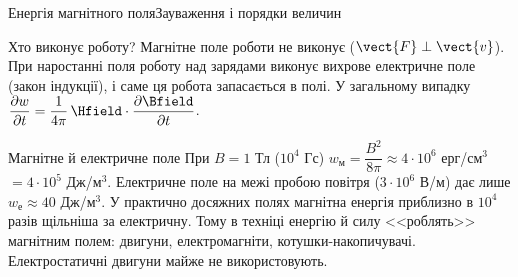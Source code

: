 \documentclass[onlytextwidth]{beamer}
\begin{document}
\begin{frame}{Енергія магнітного поля}{Зауваження і порядки величин}\small
	\begin{block}{Хто виконує роботу?}\justifying
		Магнітне поле роботи не виконує ($\vect{F}\perp\vect{v}$). При наростанні поля роботу над зарядами виконує \alert{вихрове електричне
		поле} (закон індукції), і саме ця робота запасається в полі. У загальному випадку
		$\dfrac{\partial w}{\partial t} = \dfrac{1}{4\pi}\,\Hfield\cdot\dfrac{\partial \Bfield}{\partial t}$.
	\end{block}
	\begin{block}{Магнітне й електричне поле}\justifying
		При $B = 1$ Тл ($10^4$ Гс) $w_\text{м} = \dfrac{B^2}{8\pi}\approx 4\cdot10^{6}$ ерг/см$^3$ $= 4\cdot 10^5$ Дж/м$^3$. Електричне поле на
		межі пробою повітря ($3\cdot10^6$ В/м) дає лише $w_\text{е}\approx 40$ Дж/м$^3$. \alert{У практично досяжних полях магнітна енергія
		приблизно в $10^4$ разів щільніша за електричну.} Тому в техніці енергію й силу <<роблять>> магнітним полем: двигуни, електромагніти,
		котушки-накопичувачі. Електростатичні двигуни майже не використовують.
	\end{block}
\end{frame}
\end{document}
